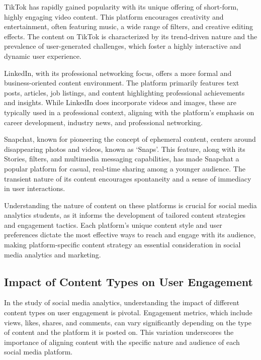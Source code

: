 \documentclass[
]{book}
\begin{document}
TikTok has rapidly gained popularity with its unique offering of short-form, highly engaging video content. This platform encourages creativity and entertainment, often featuring music, a wide range of filters, and creative editing effects. The content on TikTok is characterized by its trend-driven nature and the prevalence of user-generated challenges, which foster a highly interactive and dynamic user experience.

LinkedIn, with its professional networking focus, offers a more formal and business-oriented content environment. The platform primarily features text posts, articles, job listings, and content highlighting professional achievements and insights. While LinkedIn does incorporate videos and images, these are typically used in a professional context, aligning with the platform's emphasis on career development, industry news, and professional networking.

Snapchat, known for pioneering the concept of ephemeral content, centers around disappearing photos and videos, known as `Snaps'. This feature, along with its Stories, filters, and multimedia messaging capabilities, has made Snapchat a popular platform for casual, real-time sharing among a younger audience. The transient nature of its content encourages spontaneity and a sense of immediacy in user interactions.

Understanding the nature of content on these platforms is crucial for social media analytics students, as it informs the development of tailored content strategies and engagement tactics. Each platform's unique content style and user preferences dictate the most effective ways to reach and engage with its audience, making platform-specific content strategy an essential consideration in social media analytics and marketing.

\hypertarget{impact-of-content-types-on-user-engagement}{%
\subsection*{Impact of Content Types on User Engagement}\label{impact-of-content-types-on-user-engagement}}

In the study of social media analytics, understanding the impact of different content types on user engagement is pivotal. Engagement metrics, which include views, likes, shares, and comments, can vary significantly depending on the type of content and the platform it is posted on. This variation underscores the importance of aligning content with the specific nature and audience of each social media platform.
\end{document}
